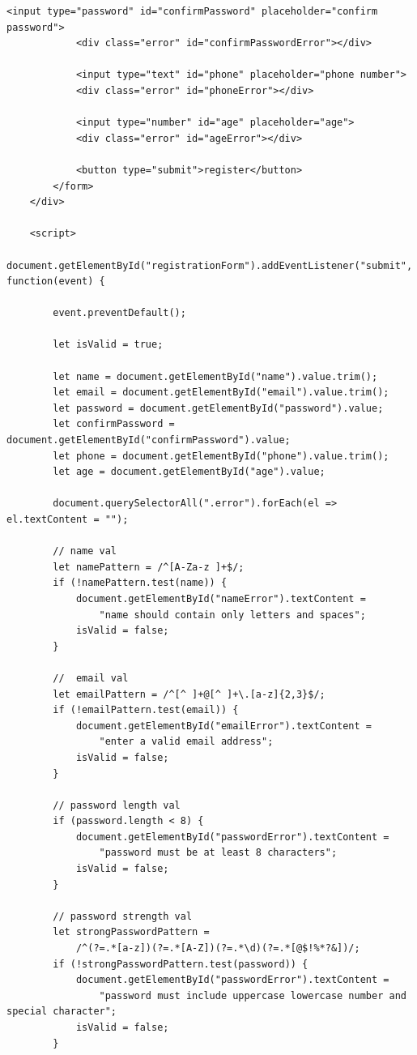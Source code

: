 \documentclass[12pt, a4paper]{report}
\begin{document}
\begin{lstlisting}[caption={\texttt{index.html}}]
            <input type="password" id="confirmPassword" placeholder="confirm password">
            <div class="error" id="confirmPasswordError"></div>

            <input type="text" id="phone" placeholder="phone number">
            <div class="error" id="phoneError"></div>

            <input type="number" id="age" placeholder="age">
            <div class="error" id="ageError"></div>

            <button type="submit">register</button>
        </form>
    </div>

    <script>
    document.getElementById("registrationForm").addEventListener("submit", function(event) {

        event.preventDefault();

        let isValid = true;

        let name = document.getElementById("name").value.trim();
        let email = document.getElementById("email").value.trim();
        let password = document.getElementById("password").value;
        let confirmPassword = document.getElementById("confirmPassword").value;
        let phone = document.getElementById("phone").value.trim();
        let age = document.getElementById("age").value;

        document.querySelectorAll(".error").forEach(el => el.textContent = "");

        // name val
        let namePattern = /^[A-Za-z ]+$/;
        if (!namePattern.test(name)) {
            document.getElementById("nameError").textContent =
                "name should contain only letters and spaces";
            isValid = false;
        }

        //  email val
        let emailPattern = /^[^ ]+@[^ ]+\.[a-z]{2,3}$/;
        if (!emailPattern.test(email)) {
            document.getElementById("emailError").textContent =
                "enter a valid email address";
            isValid = false;
        }

        // password length val
        if (password.length < 8) {
            document.getElementById("passwordError").textContent =
                "password must be at least 8 characters";
            isValid = false;
        }

        // password strength val
        let strongPasswordPattern =
            /^(?=.*[a-z])(?=.*[A-Z])(?=.*\d)(?=.*[@$!%*?&])/;
        if (!strongPasswordPattern.test(password)) {
            document.getElementById("passwordError").textContent =
                "password must include uppercase lowercase number and special character";
            isValid = false;
        }


\end{lstlisting}
\end{document}
